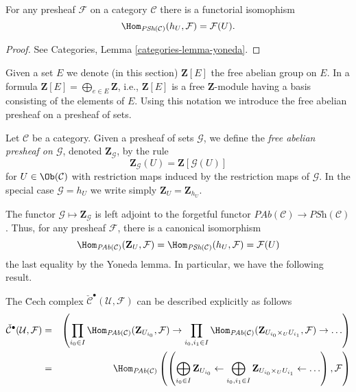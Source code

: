 \begin{lemma}
\label{lemma-yoneda-presheaf}
For any presheaf $\mathcal{F}$ on a category $\mathcal{C}$ there is a
functorial isomophism
$$
\Hom_{\textit{PSh}(\mathcal{C})}(h_U, \mathcal{F}) =
\mathcal{F}(U).
$$
\end{lemma}

\begin{proof}
See Categories, Lemma \ref{categories-lemma-yoneda}.
\end{proof}

\noindent
Given a set $E$ we denote (in this section)
$\mathbf{Z}[E]$ the free abelian group on $E$. In a formula
$\mathbf{Z}[E] = \bigoplus_{e \in E} \mathbf{Z}$, i.e., $\mathbf{Z}[E]$ is
a free $\mathbf{Z}$-module having a basis consisting of the elements of $E$.
Using this notation we introduce the free abelian presheaf on a
presheaf of sets.

\begin{definition}
\label{definition-free-abelian-presheaf}
Let $\mathcal{C}$ be a category.
Given a presheaf of sets $\mathcal{G}$, we define the
{\it free abelian presheaf on $\mathcal{G}$},
denoted $\mathbf{Z}_\mathcal{G}$, by the rule
$$
\mathbf{Z}_\mathcal{G}(U)
=
\mathbf{Z}[\mathcal{G}(U)]
$$
for $U \in \Ob(\mathcal{C})$
with restriction maps induced by the restriction maps of $\mathcal{G}$.
In the special case $\mathcal{G} = h_U$ we write simply
$\mathbf{Z}_U = \mathbf{Z}_{h_U}$.
\end{definition}

\noindent
The functor $\mathcal{G} \mapsto \mathbf{Z}_\mathcal{G}$ is left adjoint to the
forgetful functor $\textit{PAb}(\mathcal{C}) \to \textit{PSh}(\mathcal{C})$.
Thus, for any presheaf $\mathcal{F}$, there is a canonical isomorphism
$$
\Hom_{\textit{PAb}(\mathcal{C})}(\mathbf{Z}_U, \mathcal{F})
=
\Hom_{\textit{PSh}(\mathcal{C})}(h_U, \mathcal{F})
=
\mathcal{F}(U)
$$
the last equality by the Yoneda lemma. In particular, we have the following
result.

\begin{lemma}
\label{lemma-cech-complex-describe}
The \u Cech complex $\check{\mathcal{C}}^\bullet(\mathcal{U}, \mathcal{F})$
can be described explicitly as follows
\begin{eqnarray*}
\check{\mathcal{C}}^\bullet(\mathcal{U}, \mathcal{F})
& = &
\left(
\prod_{i_0 \in I}
\Hom_{\textit{PAb}(\mathcal{C})}(\mathbf{Z}_{U_{i_0}}, \mathcal{F}) \to
\prod_{i_0, i_1 \in I}
\Hom_{\textit{PAb}(\mathcal{C})}(
\mathbf{Z}_{U_{i_0} \times_U U_{i_1}}, \mathcal{F}) \to \ldots
\right) \\
& = &
\Hom_{\textit{PAb}(\mathcal{C})}\left(
\left(
\displaystyle
\bigoplus_{i_0 \in I} \mathbf{Z}_{U_{i_0}} \leftarrow
\bigoplus_{i_0, i_1 \in I} \mathbf{Z}_{U_{i_0} \times_U U_{i_1}} \leftarrow
\ldots
\right), \mathcal{F}\right)
\end{eqnarray*}
\end{lemma}

